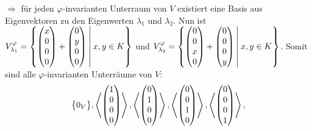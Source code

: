 \documentclass{scrreprt}
\begin{document}
\noindent
$\Rightarrow$ für jeden $\varphi$-invarianten Unterraum von $V$ existiert eine
Basis aus Eigenvektoren zu den Eigenwerten $\lambda_1$ und $\lambda_2$.
\newpage
Nun ist $V_{\lambda_1}^{\varphi} = \qty{
  \begin{pmatrix}x\\0\\0\\0\end{pmatrix} + \begin{pmatrix}0\\y\\0\\0\end{pmatrix}
  \:\middle|\: x, y \in K
}$ und $V_{\lambda_2}^{\varphi} = \qty{
  \begin{pmatrix}0\\0\\x\\0\end{pmatrix} + \begin{pmatrix}0\\0\\0\\y\end{pmatrix}
  \:\middle|\: x, y \in K
}$.
Somit sind alle $\varphi$-invarianten Unterräume von $V$:
\[
  \qty\big{0_V},
  \left\langle\begin{pmatrix}1\\0\\0\\0\end{pmatrix}\right\rangle,
  \left\langle\begin{pmatrix}0\\1\\0\\0\end{pmatrix}\right\rangle,
  \left\langle\begin{pmatrix}0\\0\\1\\0\end{pmatrix}\right\rangle,
  \left\langle\begin{pmatrix}0\\0\\0\\1\end{pmatrix}\right\rangle,
\]
\end{document}
